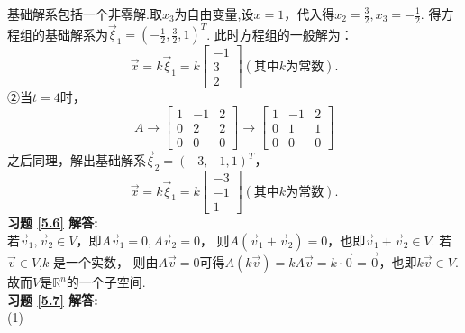 基础解系包括一个非零解.取$x_3$为自由变量,设$x=1$，代入得$x_2=\frac{3}{2},x_3=-\frac{1}{2}$.
得方程组的基础解系为$\vec{\xi}_1=(-\frac{1}{2},\frac{3}{2},1)^T$.
此时方程组的一般解为：
\begin{equation*}
\vec{x}=k\vec{\xi}_1=
k\begin{bmatrix}-1\\3\\2\end{bmatrix}(\text{其中}k\text{为常数}).
\end{equation*}
②当$t=4$时，
\begin{equation*}
A \rightarrow
   \begin{bmatrix}1&-1&2\\0&2&2\\0&0&0\end{bmatrix}
   \rightarrow
   \begin{bmatrix}1&-1&2\\0&1&1\\0&0&0\end{bmatrix}
\end{equation*}
之后同理，解出基础解系$\vec{\xi}_2=(-3,-1,1)^T$，
\begin{equation*}
\vec{x}=k\vec{\xi}_1=
k\begin{bmatrix}-3\\-1\\1\end{bmatrix}(\text{其中}k\text{为常数}).
\end{equation*}
\textbf{习题 \ref{5.6} 解答:}\\
若$\vec{v}_1,\vec{v}_2\in V$，即$A\vec{v}_1=0,A\vec{v}_2=0$，
则$A(\vec{v}_1+\vec{v}_2)=0$，也即$\vec{v}_1+\vec{v}_2\in V$. 若$\vec{v}\in V$,$k$ 是一个实数，
则由$A\vec{v}=0$可得$A(k\vec{v})=kA\vec{v}=k\cdot\vec{0}=\vec{0}$，也即$k\vec{v}\in V$.
故而$V$是$\mathbb{R}^n$的一个子空间.\\
\textbf{习题 \ref{5.7} 解答:}\\
(1)
